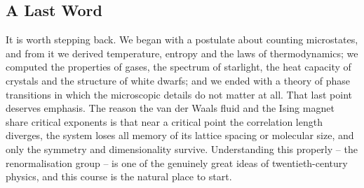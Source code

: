 \documentclass[a4paper]{scrartcl}
\begin{document}
\subsection{A Last Word}

It is worth stepping back. We began with a postulate about counting microstates, and from it we derived temperature, entropy and the laws of thermodynamics; we computed the properties of gases, the spectrum of starlight, the heat capacity of crystals and the structure of white dwarfs; and we ended with a theory of phase transitions in which the microscopic details do not matter at all. That last point deserves emphasis. The reason the van der Waals fluid and the Ising magnet share critical exponents is that near a critical point the correlation length diverges, the system loses all memory of its lattice spacing or molecular size, and only the symmetry and dimensionality survive. Understanding this properly -- the renormalisation group -- is one of the genuinely great ideas of twentieth-century physics, and this course is the natural place to start.
\end{document}

